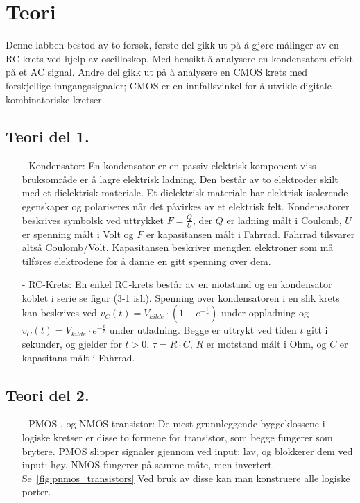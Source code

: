 \section{Teori}

Denne labben bestod av to forsøk, første del gikk ut på å gjøre målinger av en RC-krets ved hjelp av oscilloskop.
Med hensikt å analysere en kondensators effekt på et AC signal.
Andre del gikk ut på å analysere en CMOS krets med forskjellige inngangssignaler;
CMOS er en innfallsvinkel for å utvikle digitale kombinatoriske kretser.

\subsection{Teori del 1.}

    \begin{itemize}
        \item[-] Kondensator: En kondensator er en passiv elektrisk komponent viss bruksområde er å lagre elektrisk ladning.
        Den består av to elektroder skilt med et dielektrisk materiale.
        Et dielektrisk materiale har elektrisk isolerende egenskaper og polariseres når det påvirkes av et elektrisk felt.
        Kondensatorer beskrives symbolsk ved uttrykket $F = \frac{Q}{U}$, der $Q$ er ladning målt i Coulomb, $U$ er spenning målt i Volt og $F$ er kapasitansen målt i Fahrrad.
        Fahrrad tilsvarer altså Coulomb/Volt.
        Kapasitansen beskriver mengden elektroner som må tilføres elektrodene for å danne en gitt spenning over dem.
        \item[-] RC-Krets: En enkel RC-krets består av en motstand og en kondensator koblet i serie se figur (3-1 ish).
        Spenning over kondensatoren i en slik krets kan beskrives ved $v_{C}(t) = V_{kilde} \cdot \left( 1 - e^{-\frac{t}{\tau}} \right)$ under oppladning og $v_{C}(t) = V_{kilde} \cdot e^{-\frac{t}{\tau}}$ under utladning.
        Begge er uttrykt ved tiden $t$ gitt i sekunder, og gjelder for $t > 0$.
        $\tau = R \cdot C$, $R$ er motstand målt i Ohm, og $C$ er kapasitans målt i Fahrrad.
    \end{itemize}

\subsection{Teori del 2.}

    \begin{itemize}
        \item[-] PMOS-, og NMOS-transistor: De mest grunnleggende byggeklossene i logiske kretser er disse to formene for transistor, som begge fungerer som brytere.
        PMOS slipper signaler gjennom ved input: lav, og blokkerer dem ved input: høy.
        NMOS fungerer på samme måte, men invertert.
        Se~\ref{fig:pnmos_transistors} Ved bruk av disse kan man konstruere alle logiske porter.
    \end{itemize}

